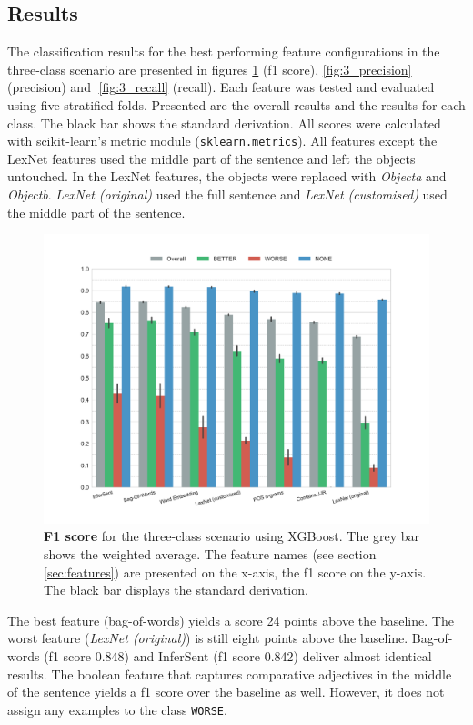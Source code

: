 \subsection{Results}
\label{sec:3_results}
The classification results for the best performing feature configurations in the three-class scenario are presented in figures \ref{fig:3_f1} (f1 score), \ref{fig:3_precision} (precision) and \ref{fig:3_recall} (recall). Each feature was tested and evaluated using five stratified folds. Presented are the overall results and the results for each class. The black bar shows the standard derivation. All scores were calculated with scikit-learn's metric module (\texttt{sklearn.metrics}). All features except the LexNet features used the middle part of the sentence and left the objects untouched. In the LexNet features, the objects were replaced with \emph{Objecta} and \emph{Objectb}. \emph{LexNet (original)} used the full sentence and \emph{LexNet (customised)} used the middle part of the sentence. 

\begin{figure}[htbp]
      \caption{\textbf{F1 score} for the three-class scenario using XGBoost. The grey bar shows the weighted average. The feature names (see section \ref{sec:features}) are presented on the x-axis, the f1 score on the y-axis. The black bar displays the standard derivation.} 
    \label{fig:3_f1}
 \centering
	\includegraphics[width=1\textwidth]{images/experiments/f1-False}

\end{figure}


The best feature (bag-of-words) yields a score 24 points above the baseline. The worst feature (\emph{LexNet (original)}) is still eight points above the baseline. Bag-of-words (f1 score 0.848) and InferSent (f1 score 0.842) deliver almost identical results. The boolean feature that captures comparative adjectives in the middle of the sentence yields a f1 score over the baseline as well. However, it does not assign any examples to the class \texttt{WORSE}.

